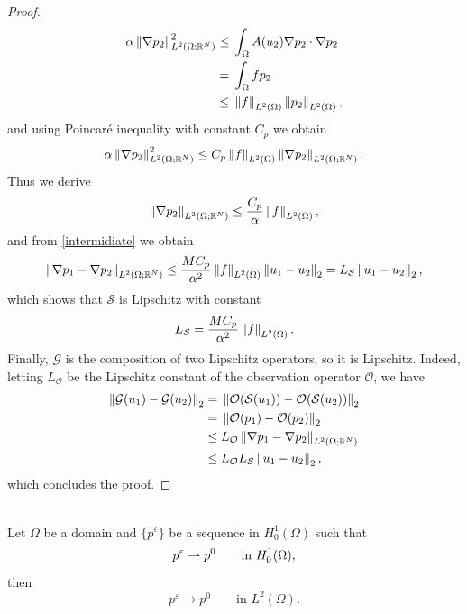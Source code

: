 \documentclass[10pt]{article}
\begin{document}
\begin{proof}
\begin{align*}
\alpha \left\|\nabla p_2\right\|_{L^2(\Omega; \mathbb{R}^N)}^2 \le & \; \int_{\Omega} A(u_2) \nabla p_2 \cdot \nabla p_2 \\
= & \; \int_{\Omega} f p_2 \\
\le & \; \left\|f\right\|_{L^2(\Omega)} \left\|p_2\right\|_{L^2(\Omega)},
\end{align*}
and using Poincar\'e inequality with constant $C_p$ we obtain
\begin{equation*}
\alpha \left\|\nabla p_2\right\|_{L^2(\Omega; \mathbb{R}^N)}^2 \le C_p \left\|f\right\|_{L^2(\Omega)} \left\|\nabla p_2\right\|_{L^2(\Omega; \mathbb{R}^N)}.
\end{equation*}
Thus we derive
\[ \left\|\nabla p_2\right\|_{L^2(\Omega; \mathbb{R}^N)} \le \frac{C_p}{\alpha} \left\|f\right\|_{L^2(\Omega)}, \]
and from \eqref{intermidiate} we obtain
\begin{equation*}
\left\|\nabla p_1 - \nabla p_2\right\|_{L^2(\Omega; \mathbb{R}^N)} \le \frac{M C_p}{\alpha^2} \left\|f\right\|_{L^2(\Omega)} \left\|u_1 - u_2\right\|_2 = L_{\mathcal{S}} \left\|u_1 - u_2\right\|_2,
\end{equation*}
which shows that $\mathcal{S}$ is Lipschitz with constant
\[ L_{\mathcal{S}} = \frac{M C_p}{\alpha^2} \left\|f\right\|_{L^2(\Omega)}. \]
Finally, $\mathcal{G}$ is the composition of two Lipschitz operators, so it is Lipschitz. Indeed, letting $L_{\mathcal{O}}$ be the Lipschitz constant of the observation operator $\mathcal{O}$, we have
\begin{align*}
\left\|\mathcal{G}(u_1) - \mathcal{G}(u_2)\right\|_2 = & \; \left\|\mathcal{O}(\mathcal{S}(u_1)) - \mathcal{O}(\mathcal{S}(u_2))\right\|_2 \\
= & \; \left\|\mathcal{O}(p_1) - \mathcal{O}(p_2)\right\|_2 \\
\le & \; L_{\mathcal{O}} \left\|\nabla p_1 - \nabla p_2\right\|_{L^2(\Omega; \mathbb{R}^N)} \\
\le & \; L_{\mathcal{O}} L_{\mathcal{S}} \left\|u_1 - u_2\right\|_2,
\end{align*}
which concludes the proof.
\end{proof}

\begin{lemma}
\label{wH1_sL2}
\leavevmode \\
Let $\Omega$ be a domain and $\{ p^{\varepsilon} \}$ be a sequence in $H^1_0(\Omega)$ such that
\[ p^{\varepsilon} \rightharpoonup p^0 \qquad \text{in } H^1_0(\Omega), \]
then
\[ p^{\varepsilon} \to p^0 \qquad \text{in } L^2(\Omega). \]
\end{lemma}
\end{document}
